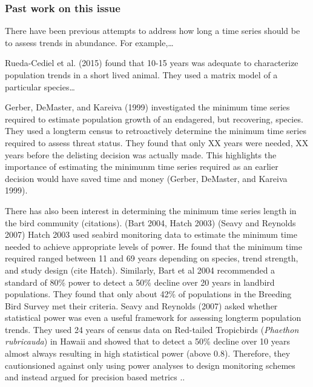\documentclass[11pt,]{article}
\begin{document}
\subsubsection{Past work on this issue}\label{past-work-on-this-issue}

There have been previous attempts to address how long a time series
should be to assess trends in abundance. For example,\ldots{}

Rueda-Cediel et al. (2015) found that 10-15 years was adequate to
characterize population trends in a short lived animal. They used a
matrix model of a particular species\ldots{}

Gerber, DeMaster, and Kareiva (1999) investigated the minimum time
series required to estimate population growth of an endagered, but
recovering, species. They used a longterm census to retroactively
determine the minimum time series required to assess threat status. They
found that only XX years were needed, XX years before the delisting
decision was actually made. This highlights the importance of estimating
the minimunm time series required as an earlier decision would have
saved time and money (Gerber, DeMaster, and Kareiva 1999).

There has also been interest in determining the minimum time series
length in the bird community (citations). (Bart 2004, Hatch 2003) (Seavy
and Reynolds 2007) Hatch 2003 used seabird monitoring data to estimate
the minimum time needed to achieve appropriate levels of power. He found
that the minimum time required ranged between 11 and 69 years depending
on species, trend strength, and study design (cite Hatch). Similarly,
Bart et al 2004 recommended a standard of 80\% power to detect a 50\%
decline over 20 years in landbird populations. They found that only
about 42\% of populations in the Breeding Bird Survey met their
criteria. Seavy and Reynolds (2007) asked whether statistical power was
even a useful framework for assessing longterm population trends. They
used 24 years of census data on Red-tailed Tropicbirds
(\emph{Phaethon rubricauda}) in Hawaii and showed that to detect a 50\%
decline over 10 years almost always resulting in high statistical power
(above 0.8). Therefore, they cautionsioned against only using power
analyses to design monitoring schemes and instead argued for precision
based metrics ..
\end{document}
